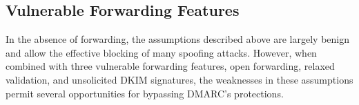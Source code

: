 








\subsection{Vulnerable Forwarding Features}
\label{subsec:fwding_vuln}
In the absence of forwarding, the assumptions described above are
largely benign and allow the effective blocking of many spoofing
attacks.  However, when combined with three vulnerable forwarding
features, open forwarding, relaxed validation, and unsolicited DKIM signatures, the weaknesses in
these assumptions permit several opportunities for bypassing DMARC's
protections.



